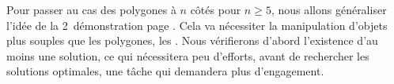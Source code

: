 Pour passer au cas des polygones à $n$ côtés pour $n \geq 5$, nous allons généraliser l'idée de la 2\ieme\ démonstration page \pageref{tri-topo-comp}. Cela va nécessiter la manipulation d'objets plus souples que les polygones, les \ncycles.
Nous vérifierons d’abord l’existence d’au moins une solution, ce qui nécessitera peu d’efforts, avant de rechercher les solutions optimales, une tâche qui demandera plus d'engagement.
